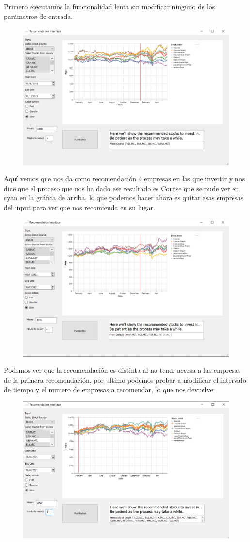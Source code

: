 \documentclass[12pt,a4paper]{article}
\begin{document}
	
	Primero ejecutamos la funcionalidad lenta sin modificar ninguno de los parámetros de entrada.\\
\begin{figure}[H]
\centering
  \centering
  \includegraphics[width=0.5\linewidth]{execution normal}
\label{fig:subrgrafo}
\end{figure}
	Aquí vemos que nos da como recomendación 4 empresas en las que invertir y nos dice que el proceso que nos ha dado ese resultado es Course que se pude ver en cyan en la gráfica de arriba, lo que podemos hacer ahora es quitar esas empresas del input para ver que nos recomienda en su lugar.\\
\begin{figure}[H]
\centering
  \centering
  \includegraphics[width=0.5\linewidth]{execution reduce stock}
\label{fig:subrgrafo}
\end{figure}
	Podemos ver que la recomendación es distinta al no tener accesa a las empresas de la primera recomendación, por ultimo podemos probar a modificar el intervalo de tiempo y el numero de empresas a recomendar, lo que nos devuelve:\\
	\begin{figure}[H]
\centering
  \centering
  \includegraphics[width=0.5\linewidth]{execution 1 m 12 k}
\label{fig:subrgrafo}
\end{figure}
\pagebreak
\end{document}
